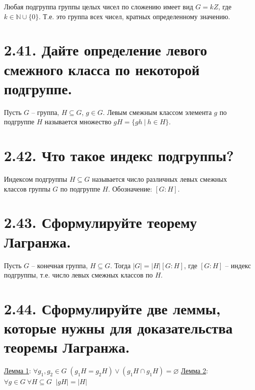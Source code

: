 \documentclass{article}
\begin{document}
Любая подгруппа группы целых чисел по сложению имеет вид $G = kZ$, где $k \in \mathbb{N}\cup\{0\}$. Т.е. это группа всех чисел, кратных определенному значению.

\section*{\LARGE 2.41. Дайте определение левого смежного класса по некоторой подгруппе. }

Пусть $G$ -- группа, $H \subseteq G$, $g \in G$. Левым смежным классом элемента $g$ по подгруппе $H$ называется множество $gH = \{gh \:|\: h \in H\}$.

\section*{\LARGE 2.42. Что такое индекс подгруппы? }

Индексом подгруппы $H \subseteq G$ называется число различных левых смежных классов группы $G$ по подгруппе $H$. Обозначение: $[G : H]$.

\section*{\LARGE 2.43. Сформулируйте теорему Лагранжа. }

Пусть $G$ -- конечная группа, $H \subseteq G$. Тогда $|G| = |H|[G : H]$, где $[G : H]$ -- индекс подгруппы, т.е. число левых смежных классов по $H$.

\section*{\LARGE 2.44. Сформулируйте две леммы, которые нужны для доказательства теоремы Лагранжа. }

\underline{Лемма 1}:
\newline $\forall g_1, g_2 \in G \; (g_1H = g_2H) \vee (g_1H \cap g_1H) = \varnothing$
\newline \underline{Лемма 2}:
\newline $\forall g \in G \: \forall H \subseteq G \;\; |gH| = |H|$
\end{document}
